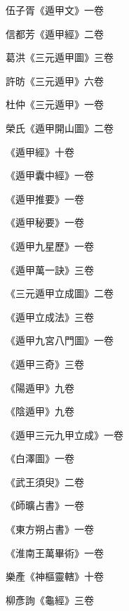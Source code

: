 \begin{pinyinscope}
 伍子胥《遁甲文》一卷



 信都芳《遁甲經》二卷



 葛洪《三元遁甲圖》三卷



 許昉《三元遁甲》六卷



 杜仲《三元遁甲》一卷



 榮氏《遁甲開山圖》二卷



 《遁甲經》十卷



 《遁甲囊中經》一卷



 《遁甲推要》一卷



 《遁甲秘要》一卷



 《遁甲九星歷》一卷



 《遁甲萬一訣》三卷



 《三元遁甲立成圖》二卷



 《遁甲立成法》三卷



 《遁甲九宮八門圖》一卷



 《遁甲三奇》三卷



 《陽遁甲》九卷



 《陰遁甲》九卷



 《遁甲三元九甲立成》一卷



 《白澤圖》一卷



 《武王須臾》二卷



 《師曠占書》一卷



 《東方朔占書》一卷



 《淮南王萬畢術》一卷



 樂產《神樞靈轄》十卷



 柳彥詢《龜經》三卷




\end{pinyinscope}

